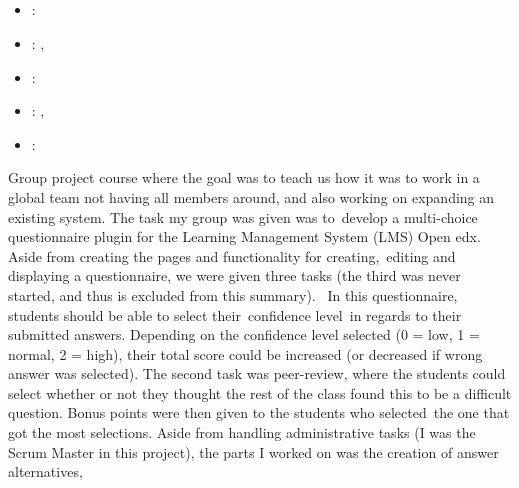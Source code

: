 \label{sec:section5}

\subsection[Global Software Development]{}
\label{sec:glob_soft_dev}
\begin{itemize} 
	\item {}: 
	\item {}: , 
	\item {}: 
	\item {}: , 
	\item {}: 
\end{itemize} 
Group project course where the goal was to teach us how it was to work in a global team not having all members around, and also working on expanding an existing system. 
The task my group was given was to develop a multi-choice questionnaire plugin for the Learning Management System (LMS) Open edx. 
\vspace{0.5em}\newline
Aside from creating the pages and functionality for creating, editing and displaying a questionnaire, we were given three tasks 
(the third was never started, and thus is excluded from this summary). 
In this questionnaire, students should be able to select their confidence level in regards to their submitted answers. 
Depending on the confidence level selected (0 = low, 1 = normal, 2 = high), their total score could be increased (or decreased if wrong answer was selected).
\vspace{0.5em}\newline
The second task was peer-review, where the students could select whether or not they thought the rest of the class found this to be a difficult question. 
Bonus points were then given to the students who selected the one that got the most selections.
\vspace{0.5em}\newline
Aside from handling administrative tasks (I was the Scrum Master in this project), the parts I worked on was the creation of answer alternatives, 
